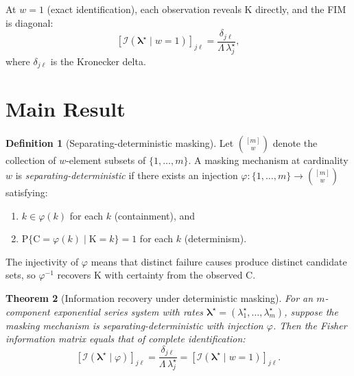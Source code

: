 \documentclass[preprint,12pt]{elsarticle}
\newcommand{\RV}[1]{\mathrm{#1}}
\newcommand{\Prob}[1]{\mathrm{P}\{#1\}}
\newcommand{\cand}{\RV{C}}         %
\newcommand{\tparam}[1]{{#1}^{\star}}  %
\newcommand{\infomatrx}{\mathcal{I}}
\renewcommand{\vec}[1]{\boldsymbol{#1}}
\newtheorem{theorem}{Theorem}[section]
\theoremstyle{definition}
\newtheorem{definition}[theorem]{Definition}
\theoremstyle{remark}
\begin{document}
At $w=1$ (exact identification), each observation reveals $\RV{K}$ directly, and
the FIM is diagonal:
\begin{equation}
\label{eq:fim_w1}
[\infomatrx(\tparam{\vec\lambda} \mid w\!=\!1)]_{j\ell}
  = \frac{\delta_{j\ell}}{\Lambda\, \tparam{\lambda}_j},
\end{equation}
where $\delta_{j\ell}$ is the Kronecker delta.

\section{Main Result}
\label{sec:main}

\begin{definition}[Separating-deterministic masking]
\label{def:sep_det}
Let $\binom{[m]}{w}$ denote the collection of $w$-element subsets of
$\{1,\ldots,m\}$. A masking mechanism at cardinality $w$ is
\emph{separating-deterministic} if there exists an injection
$\varphi\colon \{1,\ldots,m\} \to \binom{[m]}{w}$ satisfying:
\begin{enumerate}
\item $k \in \varphi(k)$ for each $k$ (containment), and
\item $\Prob{\cand = \varphi(k) \mid \RV{K} = k} = 1$ for each $k$
      (determinism).
\end{enumerate}
\end{definition}

The injectivity of $\varphi$ means that distinct failure causes produce distinct
candidate sets, so $\varphi^{-1}$ recovers $\RV{K}$ with certainty from the
observed $\cand$.

\begin{theorem}[Information recovery under deterministic masking]
\label{thm:main}
For an $m$-component exponential series system with rates
$\tparam{\vec\lambda} = (\tparam{\lambda}_1,\ldots,\tparam{\lambda}_m)$,
suppose the masking mechanism is separating-deterministic with injection
$\varphi$. Then the Fisher information matrix equals that of complete
identification:
\begin{equation}
\label{eq:main_result}
[\infomatrx(\tparam{\vec\lambda} \mid \varphi)]_{j\ell}
  = \frac{\delta_{j\ell}}{\Lambda\, \tparam{\lambda}_j}
  = [\infomatrx(\tparam{\vec\lambda} \mid w\!=\!1)]_{j\ell}.
\end{equation}
\end{theorem}
\end{document}
